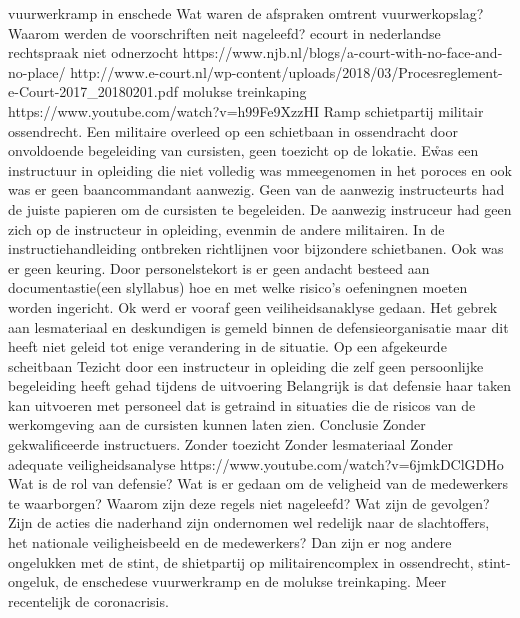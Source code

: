 \cite{TNOStint}
\newline \indent vuurwerkramp in enschede 
\cite{boogers092002RampenRegelsRichtlijnen}
Wat waren de afspraken omtrent vuurwerkopslag?
Waarom werden de voorschriften neit nageleefd?
\newline \indent  ecourt in nederlandse rechtspraak
niet odnerzocht
https://www.njb.nl/blogs/a-court-with-no-face-and-no-place/ 
\cite{sprongken19032018CourtProcedureDigital}
http://www.e-court.nl/wp-content/uploads/2018/03/Procesreglement-e-Court-2017_20180201.pdf
\cite{PROCESREGLEMENTEcourt}
\newline \indent  molukse treinkaping 
https://www.youtube.com/watch?v=h99Fe9XzzHI 
\cite{molukseTreinkaping}
\newline \indent Ramp schietpartij militair ossendrecht. Een militaire overleed op een schietbaan in ossendracht door onvoldoende begeleiding van cursisten, geen toezicht op de lokatie. E\r was een instructuur in opleiding die niet volledig was mmeegenomen in het poroces en ook was er geen baancommandant aanwezig. Geen van de aanwezig instructeurts had de juiste papieren om de cursisten te begeleiden. De aanwezig instruceur had geen zich op de instructeur in opleiding, evenmin de andere militairen. In de instructiehandleiding ontbreken richtlijnen voor bijzondere schietbanen. Ook was er geen keuring. Door personelstekort is er geen andacht besteed aan documentastie(een slyllabus) hoe en met welke risico’s oefeningnen moeten worden ingericht. Ok werd er vooraf geen veiliheidsanaklyse gedaan. Het gebrek aan lesmateriaal en deskundigen is gemeld binnen de defensieorganisatie maar dit heeft niet geleid tot enige verandering in de situatie.
Op een afgekeurde scheitbaan
Tezicht door een instructeur in opleiding die zelf geen persoonlijke begeleiding heeft gehad tijdens de uitvoering
Belangrijk is dat defensie haar taken kan uitvoeren met personeel dat is getraind in situaties die de risicos van de werkomgeving aan de cursisten kunnen laten zien.
Conclusie
Zonder gekwalificeerde instructuers.
Zonder toezicht
Zonder lesmateriaal
Zonder adequate veiligheidsanalyse
https://www.youtube.com/watch?v=6jmkDClGDHo 
\cite{oVVSchietongevalOssendrecht}
\cite{nos22032016ossendrecht}
\cite{ovv04042016lessenongevalossendrecht}
\cite{quekelboere10052017doodossendrecht}
Wat is de rol van defensie?
Wat is er gedaan om de veligheid van de medewerkers te waarborgen?
Waarom zijn deze regels niet nageleefd?
Wat zijn de gevolgen?
Zijn de acties die naderhand zijn ondernomen wel redelijk naar de slachtoffers, het nationale veiligheisbeeld en de medewerkers?
\newline \indent Dan zijn er nog andere ongelukken met de stint, de shietpartij op militairencomplex in ossendrecht, stint-ongeluk, de enschedese vuurwerkramp en de molukse treinkaping. Meer recentelijk de coronacrisis.


